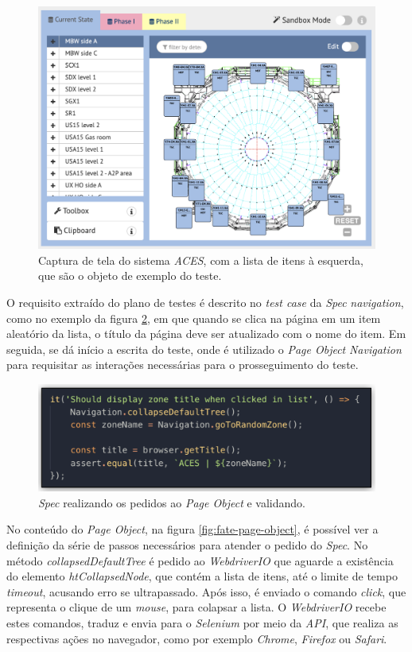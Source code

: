 \begin{figure}[H]
    \centering
    \includegraphics[width=11.75cm]{source/4-solucao/images/aces-example.png}
    \caption{Captura de tela do sistema \emph{ACES}, com a lista de itens à esquerda, que são o objeto de exemplo do teste.}
    \label{fig:aces-example}
\end{figure}

O requisito extraído do plano de testes é descrito no \emph{test case} da \emph{Spec} \emph{navigation}, como no exemplo da figura \ref{fig:fate-spec}, em que quando se clica na página em um item aleatório da lista, o título da página deve ser atualizado com o nome do item. Em seguida, se dá início a escrita do teste, onde é utilizado o \emph{Page Object} \emph{Navigation} para requisitar as interações necessárias para o prosseguimento do teste.

\begin{figure}[H]
    \centering
    \includegraphics[width=13cm]{source/4-solucao/images/fate-spec.png}
    \caption{\emph{Spec} realizando os pedidos ao \emph{Page Object} e validando.}
    \label{fig:fate-spec}
\end{figure}

No conteúdo do \emph{Page Object}, na figura \ref{fig:fate-page-object}, é possível ver a definição da série de passos necessários para atender o pedido do \emph{Spec}. No método \emph{collapsedDefaultTree} é pedido ao \emph{WebdriverIO} que aguarde a existência do elemento \emph{htCollapsedNode}, que contém a lista de itens, até o limite de tempo \emph{timeout}, acusando erro se ultrapassado. Após isso, é enviado o comando \emph{click}, que representa o clique de um \emph{mouse}, para colapsar a lista. O \emph{WebdriverIO} recebe estes comandos, traduz e envia para o \emph{Selenium} por meio da \emph{API}, que realiza as respectivas ações no navegador, como por exemplo \emph{Chrome}, \emph{Firefox} ou \emph{Safari}.

